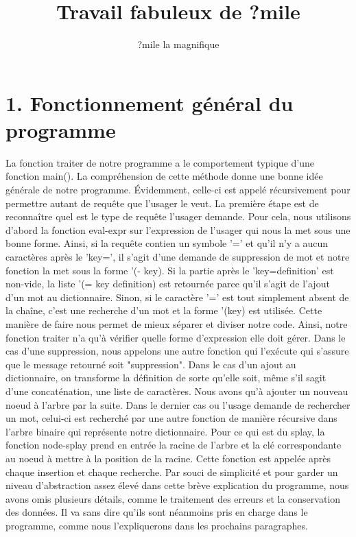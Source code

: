 \documentclass[french]{article}
\title{Travail fabuleux de ?mile}
\author{?mile la magnifique}
\begin{document}
	\maketitle	
	
	\section{1. Fonctionnement général du programme}
		La fonction traiter de notre programme a le comportement typique d'une fonction main(). La compréhension de cette méthode
		donne une bonne idée générale de notre programme. Évidemment, celle-ci est appelé récursivement pour permettre autant de 
		requête que l'usager le veut.
			La première étape est de reconnaître quel est le type de requête l'usager demande. Pour cela, nous utilisons d'abord
		la fonction eval-expr sur l'expression de l'usager qui nous la met sous une bonne forme. Ainsi, si la requête contien un
		symbole '=' et qu'il n'y a aucun caractères après le 'key=', il s'agit d'une demande de suppression de mot et notre fonction
		la met sous la forme '(- key). Si la partie après le 'key=definition' est non-vide, la liste '(= key definition) est retournée parce 
		qu'il s'agit de l'ajout d'un mot au dictionnaire. Sinon, si le caractère '=' est tout simplement absent de la chaîne, c'est
		une recherche d'un mot et la forme '(key) est utilisée. Cette manière de faire nous permet de mieux séparer et diviser notre
		code. 
			Ainsi, notre fonction traiter n'a qu'à vérifier quelle forme d'expression elle doit gérer. Dans le cas d'une suppression,
		nous appelons une autre fonction qui l'exécute qui s'assure que le message retourné soit "suppression". Dans le cas d'un ajout 
		au dictionnaire, on transforme la définition de sorte qu'elle soit, même s'il sagit d'une concaténation, une liste de caractères.
		Nous avons qu'à ajouter un nouveau noeud à l'arbre par la suite. Dans le dernier cas ou l'usage demande de rechercher un mot,
		celui-ci est recherché par une autre fonction de manière récursive dans l'arbre binaire qui représente notre dictionnaire.
			Pour ce qui est du splay, la fonction node-splay prend en entrée la racine de l'arbre et la clé correspondante au noeud à mettre à la position de la racine. Cette fonction est appelée après chaque insertion et chaque recherche.
			Par souci de simplicité et pour garder un niveau d’abstraction assez élevé dans cette brève explication du programme,
		nous avons omis plusieurs détails, comme le traitement des erreurs et la conservation des données. Il va sans dire qu’ils sont
		néanmoins pris en charge dans le programme, comme nous l’expliquerons dans les prochains paragraphes.		
		
\end{document}
